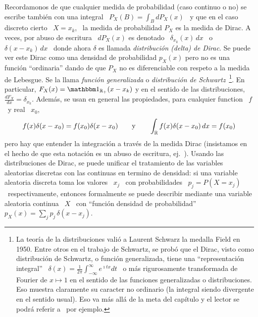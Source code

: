 Recordamonos de  que cualquier  medida de probabilidad  (caso continuo o  no) se
escribe tambi\'en con una integral \ $\displaystyle P_X(B) = \int_B dP_X(x)$ \ y
que en el caso discreto cierto \ $X = x_k$, \ la medida de probabilidad $P_X$ es
la medida de  Dirac. A veces, por  abuso de escritura \ $dP_X(x)$  es denotado \
$\delta_{x_k}(x) \,  dx$ \ o \ $\delta(x-x_k)  \, dx$ \ donde  ahora $\delta$ es
llamada {\it distribuci\'on (delta) de Dirac}.  Se puede ver este Dirac como una
densidad de probabilidad  $p_X(x)$ pero no es una  funci\'on ``ordinaria'' dando
de que  $P_X$ no es  diferenciable con  respeto a la  medida de Lebesgue.  Se la
llama    {\it    funci\'on    generalizada}    o    {\it    distribuci\'on    de
  Schwartz}~\footnote{La teor\'ia de la distribuciones vali\'o a Laurent Schwarz
  la medalla Field  en 1950.  Entre otros en el trabajo  de Schwartz, se prob\'o
  que el Dirac, visto como distribuci\'on de Schwartz, o funci\'on generalizada,
  tiene   una  ``representaci\'on  integral''   \  $\displaystyle   \delta(x)  =
  \frac{1}{2\pi}  \int_{-\infty}^{\infty}   e^{\imath  t   x}  dt$  \   o  m\'as
  rigurosamente transformada  de Fourier de $x  \mapsto 1$ en el  sentido de las
  funciones generalizadas o distribuciones.   Eso muestra claramente su caracter
  no  ordinario (la integral  siendo divergente  en el  sentido usual).   Eso va
  m\'as  all\'a  de la  meta  del  cap\'itulo y  el  lector  se podr\'a  referir
  a~\cite{Sch66, GelShi64,  GelShi68} por  ejemplo.}.  En particular,  $F_X(x) =
\un_{\Rset_+}(x-x_k)$ y en el sentido de las distribuciones, $\frac{d F_X}{dx} =
\delta_{x_k}$.   Adem\'as, se usan  en general  las propiedades,  para cualquier
function \ $f$ \ y real \ $x_0$,
%
\[
f(x) \delta(x-x_0) = f(x_0) \delta(x-x_0) \qquad \mbox{y} \qquad \int_{\mathbb{R}} f(x)
\delta(x-x_0) \, dx = f(x_0)
\]
%
pero hay que entender la integraci\'on a trav\'es de la medida Dirac (insistamos
en   el   hecho   de  que   esta   notaci\'on   es   un  abuso   de   escritura,
ej.~\cite{GelShi64}).  Usando las distribuciones  de Dirac, se puede unificar el
tratamiento de las  variables aleatorias discretas con las  continuas en termino
de densidad: si  una variable aleatoria discreta toma los valores  \ $x_j$ \ con
probabilidades \ $p_j  = P(X = x_j)$ \  respectivamente, entonces formalmente se
puede describir mediante una variable aleatoria continua \ $X$ \ con ``funci\'on
densidad de probabilidad'' \ $p_X(x) = \sum_j p_j \, \delta(x-x_j)$.



